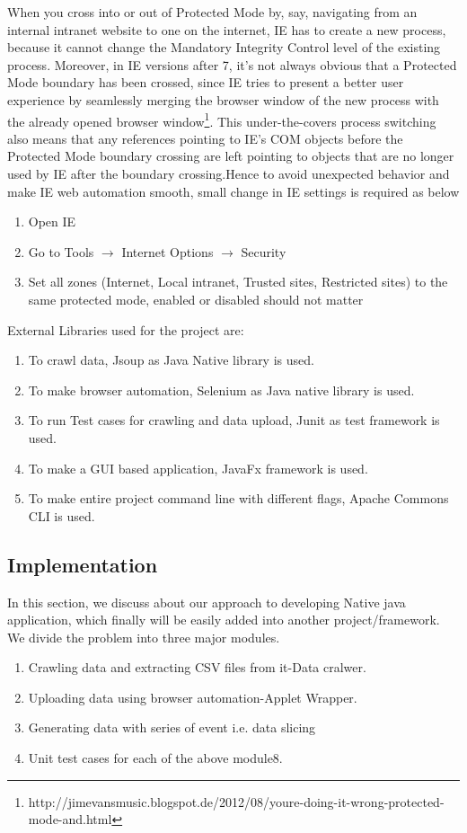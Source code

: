 \documentclass[article,type=msc,colorback,accentcolor=tud9c,twoside,11pt]{tudthesis}
\begin{document}
When you cross into or out of Protected Mode by, say, navigating from an internal intranet website to one on the internet, IE has to create a new process, because it cannot change the Mandatory Integrity Control level of the existing process. Moreover, in IE versions after 7, it's not always obvious that a Protected Mode boundary has been crossed, since IE tries to present a better user experience by seamlessly merging the browser window of the new process with the already opened browser window\footnote{http://jimevansmusic.blogspot.de/2012/08/youre-doing-it-wrong-protected-mode-and.html}. This under-the-covers process switching also means that any references pointing to IE's COM objects before the Protected Mode boundary crossing are left pointing to objects that are no longer used by IE after the boundary crossing.Hence to avoid unexpected behavior and make IE web automation smooth, small change in IE settings is required as below
\begin{enumerate}
\item Open IE
\item Go to Tools $\rightarrow$ {Internet Options} $\rightarrow$ {Security}
\item Set all zones (Internet, Local intranet, Trusted sites, Restricted sites) to the same protected mode, enabled or disabled should not matter
\end{enumerate}
External Libraries used for the project are:
\begin{enumerate}
\item To crawl data, Jsoup as Java Native library is used.
\item To make browser automation, Selenium as Java native library is used.
\item To run Test cases for crawling and data upload, Junit as test framework is used. 
\item To make a GUI based application, JavaFx framework is used.
\item To make entire project command line with different flags, Apache Commons CLI is used. 
\end{enumerate}

\subsection{Implementation}
In this section, we discuss about our approach to developing Native java application, which finally will be easily added into another project/framework. We divide the problem into three major modules.
\begin{enumerate}
	\item Crawling data and extracting CSV files from it-Data cralwer.
	\item Uploading data using browser automation-Applet Wrapper.
	\item Generating data with series of event i.e. data slicing
	\item Unit test cases for each of the above module8.
	
\end{enumerate}
\end{document}

